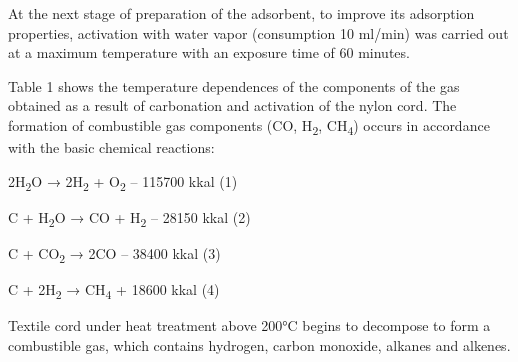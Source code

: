 \begin{multicols}{2}
At the next stage of preparation of the adsorbent, to improve its
adsorption properties, activation with water vapor (consumption 10
ml/min) was carried out at a maximum temperature with an exposure time
of 60 minutes.

Table 1 shows the temperature dependences of the components of the gas
obtained as a result of carbonation and activation of the nylon cord.
The formation of combustible gas components (CO, H\textsubscript{2},
CH\textsubscript{4}) occurs in accordance with the basic chemical
reactions:

2H\textsubscript{2}O → 2H\textsubscript{2} + O\textsubscript{2} --
115700 kkal (1)

C + H\textsubscript{2}O → CO + H\textsubscript{2} -- 28150 kkal (2)

C + CO\textsubscript{2} → 2CO -- 38400 kkal (3)

C + 2H\textsubscript{2} → CH\textsubscript{4} + 18600 kkal (4)

Textile cord under heat treatment above 200°C begins to decompose to
form a combustible gas, which contains hydrogen, carbon monoxide,
alkanes and alkenes.
\end{multicols}

